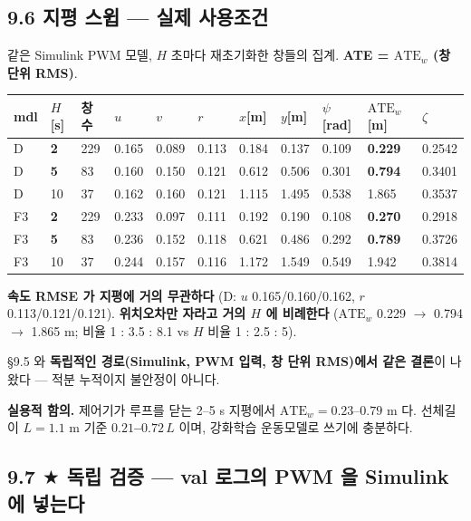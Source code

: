 \documentclass[10pt,a4paper]{article}
\begin{document}
\subsection*{9.6 지평 스윕 --- 실제 사용조건}

같은 Simulink PWM 모델, $H$ 초마다 재초기화한 창들의 집계. \textbf{ATE = $\mathrm{ATE}_w$ (창 단위 RMS)}.

\begin{center}\scriptsize\setlength{\tabcolsep}{3pt}
\begin{tabular}{@{}lllllllllll@{}}
\toprule
\textbf{mdl} & \textbf{$H$[s]} & \textbf{창수} & \textbf{$u$} & \textbf{$v$} & \textbf{$r$} & \textbf{$x$[m]} & \textbf{$y$[m]} & \textbf{$\psi$[rad]} & \textbf{$\mathrm{ATE}_w$[m]} & \textbf{$\zeta$} \\
\midrule
D & \textbf{2} & 229 & 0.165 & 0.089 & 0.113 & 0.184 & 0.137 & 0.109 & \textbf{0.229} & 0.2542 \\
D & \textbf{5} & 83 & 0.160 & 0.150 & 0.121 & 0.612 & 0.506 & 0.301 & \textbf{0.794} & 0.3401 \\
D & 10 & 37 & 0.162 & 0.160 & 0.121 & 1.115 & 1.495 & 0.538 & 1.865 & 0.3537 \\
F3 & \textbf{2} & 229 & 0.233 & 0.097 & 0.111 & 0.192 & 0.190 & 0.108 & \textbf{0.270} & 0.2918 \\
F3 & \textbf{5} & 83 & 0.236 & 0.152 & 0.118 & 0.621 & 0.486 & 0.292 & \textbf{0.789} & 0.3726 \\
F3 & 10 & 37 & 0.244 & 0.157 & 0.116 & 1.172 & 1.549 & 0.549 & 1.942 & 0.3814 \\
\bottomrule
\end{tabular}
\end{center}

\textbf{속도 RMSE 가 지평에 거의 무관하다} (D: $u$ 0.165/0.160/0.162, $r$ 0.113/0.121/0.121). \textbf{위치오차만 자라고 거의 $H$ 에 비례한다} ($\mathrm{ATE}_w$ 0.229 $\to$ 0.794 $\to$ 1.865 m; 비율 1 : 3.5 : 8.1 vs $H$ 비율 1 : 2.5 : 5).

\S{}9.5 와 \textbf{독립적인 경로(Simulink, PWM 입력, 창 단위 RMS)에서 같은 결론}이 나왔다 --- 적분 누적이지 불안정이 아니다.

\textbf{실용적 함의.} 제어기가 루프를 닫는 2--5 s 지평에서 $\mathrm{ATE}_w = 0.23$--$0.79$ m 다. 선체길이 $L = 1.1$ m 기준 \textbf{$0.21$--$0.72\,L$} 이며, 강화학습 운동모델로 쓰기에 충분하다.

\subsection*{9.7 $\bigstar$ 독립 검증 --- val 로그의 PWM 을 Simulink 에 넣는다}
\end{document}
